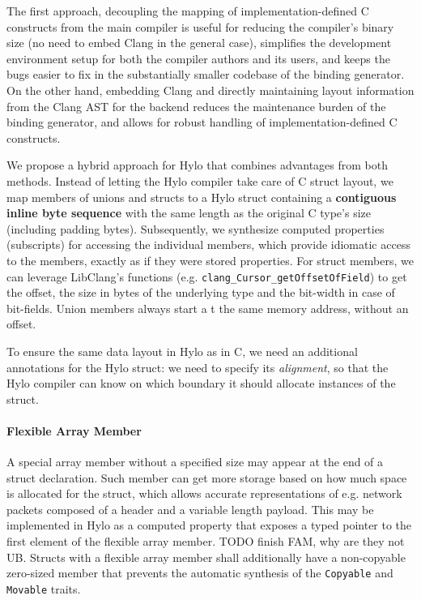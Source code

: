 The first approach, decoupling the mapping of implementation-defined C constructs from the main compiler is useful for reducing the compiler's binary size (no need to embed Clang in the general case), simplifies the development environment setup for both the compiler authors and its users, and keeps the bugs easier to fix in the substantially smaller codebase of the binding generator. On the other hand, embedding Clang and directly maintaining layout information from the Clang AST for the backend reduces the maintenance burden of the binding generator, and allows for robust handling of implementation-defined C constructs.

We propose a hybrid approach for Hylo that combines advantages from both methods. Instead of letting the Hylo compiler take care of C struct layout, we map members of unions and structs to a Hylo struct containing a \textbf{contiguous inline byte sequence} with the same length as the original C type's size (including padding bytes). Subsequently, we synthesize computed properties (subscripts) for accessing the individual members, which provide idiomatic access to the members, exactly as if they were stored properties. For struct members, we can leverage LibClang's functions (e.g. \texttt{clang\_Cursor\_getOffsetOfField}) to get the offset, the size in bytes of the underlying type and the bit-width in case of bit-fields. Union members always start a  t the same memory address, without an offset\cite{c23-struct-and-union-specifiers}.

To ensure the same data layout in Hylo as in C, we need an additional annotations for the Hylo struct: we need to specify its \textit{alignment}, so that the Hylo compiler can know on which boundary it should allocate instances of the struct.

\paragraph{
Flexible Array Member
    }
    \label{par:fam}
    A special array member without a specified size may appear at the end of a struct declaration. Such member can get more storage based on how much space is allocated for the struct, which allows accurate representations of e.g. network packets composed of a header and a variable length payload. This may be implemented in Hylo as a computed property that exposes a typed pointer to the first element of the flexible array member. TODO finish FAM, why are they not UB. Structs with a flexible array member shall additionally have a non-copyable zero-sized member that prevents the automatic synthesis of the \texttt{Copyable} and \texttt{Movable} traits.

